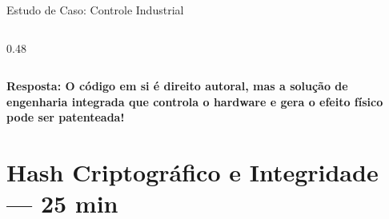 \documentclass[9pt]{beamer}
\begin{document}
\begin{frame}{Estudo de Caso: Controle Industrial}
\begin{columns}[T]
\begin{column}{0.48\textwidth}
\begin{center}
      \end{center}
    \end{column}
  \end{columns}
  
  \vspace{0.1cm}
  \begin{center}
    \scriptsize\color{structure.fg}\bfseries Resposta: O código em si é direito autoral, mas a solução de engenharia integrada que controla o hardware e gera o efeito físico pode ser patenteada!
  \end{center}
\end{frame}

\section{Hash Criptográfico e Integridade — 25 min}
\end{document}
